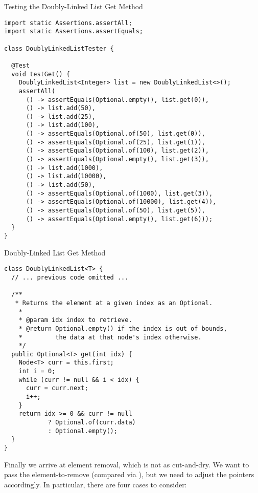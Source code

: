 \begin{cl}{Testing the Doubly-Linked List Get Method}
\begin{lstlisting}[language=MyJava]
import static Assertions.assertAll;
import static Assertions.assertEquals;

class DoublyLinkedListTester {

  @Test
  void testGet() {
    DoublyLinkedList<Integer> list = new DoublyLinkedList<>();
    assertAll(
      () -> assertEquals(Optional.empty(), list.get(0)),
      () -> list.add(50),
      () -> list.add(25),
      () -> list.add(100),
      () -> assertEquals(Optional.of(50), list.get(0)),
      () -> assertEquals(Optional.of(25), list.get(1)),
      () -> assertEquals(Optional.of(100), list.get(2)),
      () -> assertEquals(Optional.empty(), list.get(3)),
      () -> list.add(1000),
      () -> list.add(10000),
      () -> list.add(50),
      () -> assertEquals(Optional.of(1000), list.get(3)),
      () -> assertEquals(Optional.of(10000), list.get(4)),
      () -> assertEquals(Optional.of(50), list.get(5)),
      () -> assertEquals(Optional.empty(), list.get(6)));
  }
}
\end{lstlisting}
\end{cl}

\begin{cl}{Doubly-Linked List Get Method}
\begin{lstlisting}[language=MyJava]
class DoublyLinkedList<T> {
  // ... previous code omitted ...

  /**
   * Returns the element at a given index as an Optional.
    * 
    * @param idx index to retrieve.
    * @return Optional.empty() if the index is out of bounds,
    *         the data at that node's index otherwise.
    */
  public Optional<T> get(int idx) {
    Node<T> curr = this.first;
    int i = 0;
    while (curr != null && i < idx) {
      curr = curr.next;
      i++;
    }
    return idx >= 0 && curr != null
            ? Optional.of(curr.data)
            : Optional.empty();
  }
}
\end{lstlisting}
\end{cl}

Finally we arrive at element removal, which is not as cut-and-dry. We want to pass the element-to-remove (compared via ), but we need to adjust the pointers accordingly. In particular, there are four cases to consider:

